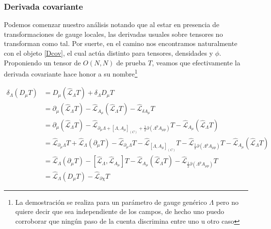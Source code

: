 \documentclass{article}
\numberwithin{equation}{section}
\begin{document}
\subsubsection{Derivada covariante}

Podemos comenzar nuestro análisis notando que al estar en presencia de transformaciones de gauge locales, las derivadas usuales sobre tensores no transforman como tal. Por suerte, en el camino nos encontramos naturalmente con el objeto \ref{Dcov}, el cual actúa distinto para tensores, densidades y $ \phi $. Proponiendo un tensor de $ O(N,N) $ de prueba $ T $, veamos que efectivamente la derivada covariante hace honor a su nombre\footnote{La demostración se realiza para un parámetro de gauge genérico $ \Lambda $ pero no quiere decir que sea independiente de los campos, de hecho uno puedo corroborar que ningún paso de la cuenta discrimina entre uno u otro caso}

\begin{equation}\label{Dcovdeduction}
\begin{aligned}
\delta_{\Lambda} \left( D_{\mu} T \right) &= D_{\mu} \left( \hat{\mathcal{L}}_{\Lambda} T\right) + \delta_{\Lambda} D_{\mu} T\\
&=\partial_{\mu} \left( \hat{\mathcal{L}}_{\Lambda} T \right) - \hat{\mathcal{L}}_{ A_{\mu}}\left( \hat{\mathcal{L}}_{\Lambda} T\right) - \hat{\mathcal{L}}_{\delta A_{\mu}} T\\
&= \partial_{\mu} \left( \hat{\mathcal{L}}_{\Lambda} T \right) - \hat{\mathcal{L}}_{\partial_{\mu} 
\Lambda + \left[ \Lambda, A_{\mu}\right]_{(C)} + \frac{1}{2} \partial \left(\Lambda^p A_{\mu p} \right)}T - \hat{\mathcal{L}}_{ A_{\mu}}\left( \hat{\mathcal{L}}_{\Lambda} T\right)\\
&= \hat{\mathcal{L}}_{\partial_{\mu} \Lambda} T + \hat{\mathcal{L}}_{\Lambda} \left(\partial_{\mu}T\right) - \hat{\mathcal{L}}_{\partial_{\mu}\Lambda}T - \hat{\mathcal{L}}_{\left[ \Lambda, A_{\mu}\right]_{(C)}}T -\hat{\mathcal{L}}_{\frac{1}{2} \partial \left(\Lambda^p A_{\mu p} \right)}T- \hat{\mathcal{L}}_{ A_{\mu}}\left( \hat{\mathcal{L}}_{\Lambda} T\right)\\
&= \hat{\mathcal{L}}_{\Lambda} \left(\partial_{\mu}T\right) - \left[\hat{\mathcal{L}}_{\Lambda}, \hat{\mathcal{L}}_{A_{\mu}}\right] T - \hat{\mathcal{L}}_{ A_{\mu}}\left( \hat{\mathcal{L}}_{\Lambda} T\right) -\hat{\mathcal{L}}_{\frac{1}{2} \partial \left(\Lambda^p A_{\mu p} \right)}T\\
&= \hat{\mathcal{L}}_{\Lambda} \left( D_{\mu} T \right) -\hat{\mathcal{L}}_{\partial \chi}T
\end{aligned}
\end{equation}
\end{document}
